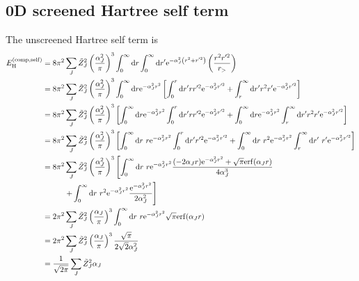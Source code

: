 \documentclass[paper=a4, fontsize=11pt]{article} %
\numberwithin{equation}{section} %
\numberwithin{figure}{section} %
\numberwithin{table}{section} %
\newcommand{\rself}{{\mathrm{self}}}
\newcommand{\re}{{\mathrm{e}}}
\newcommand{\rerf}{{\mathrm{erf}}}
\newcommand{\rd}{{\mathrm{d}}}
\newcommand{\rH}{{\mathrm{H}}}
\newcommand{\rcomp}{{\mathrm{comp}}}
\newcommand{\al}{{\alpha}}
\begin{document}
\subsection{0D screened Hartree self term}
The unscreened Hartree self term is
\begin{equation}
\begin{split}
E_{\rH}^{(\rcomp,\rself)}
&= 8\pi^2 \sum_J \tilde Z_J^2 \left(\frac{\al_J^2}{\pi}\right)^3  \int_0^\infty \rd r \int_0^\infty \rd r' \re^{-\al_J^2 \left(r^2+r'^2\right)} \left( \frac{r^2 r'^2}{r_{>}} \right)\\
&= 8\pi^2 \sum_J \tilde Z_J^2 \left(\frac{\al_J^2}{\pi}\right)^3  \int_0^\infty \rd r \re^{-\al_J^2 r^2} \left[ \int_0^r \rd r' r r'^2 \re^{-\al_J^2 r'^2}+ \int_r^\infty \rd r' r^2 r' \re^{-\al_J^2 r'^2} \right]\\
&= 8\pi^2 \sum_J \tilde Z_J^2 \left(\frac{\al_J^2}{\pi}\right)^3 \left[  \int_0^\infty \rd r \re^{-\al_J^2 r^2} \int_0^r \rd r' r r'^2 \re^{-\al_J^2 r'^2}+  \int_0^\infty \rd r \re^{-\al_J^2 r^2} \int_r^\infty \rd r' r^2 r' \re^{-\al_J^2 r'^2} \right]\\
&= 8\pi^2 \sum_J \tilde Z_J^2 \left(\frac{\al_J^2}{\pi}\right)^3 \left[  \int_0^\infty \rd r\ r \re^{-\al_J^2 r^2} \int_0^r \rd r' r'^2 \re^{-\al_J^2 r'^2}+  \int_0^\infty \rd r\ r^2 \re^{-\al_J^2 r^2} \int_r^\infty \rd r'\ r' \re^{-\al_J^2 r'^2} \right]\\
&= 8\pi^2 \sum_J \tilde Z_J^2 \left(\frac{\al_J^2}{\pi}\right)^3 \left[  \int_0^\infty \rd r\ r \re^{-\al_J^2 r^2} \frac{(-2 \al_J r)\re^{-\al_J^2 r^2} + \sqrt{\pi} \rerf(\al_J r)}{4 \al_J^3}\right.\\  
&\left. \hspace{10mm}+ \int_0^\infty \rd r\ r^2 \re^{-\al_J^2 r^2} \frac{\re^{-\al_J^2 r^2}}{2 \al_J^2} \right]\\
&= 2\pi^2 \sum_J \tilde Z_J^2 \left(\frac{\al_J}{\pi}\right)^3 \int_0^\infty \rd r\ r \re^{-\al_J^2 r^2} \sqrt{\pi} \rerf(\al_J r) \\
&= 2\pi^2 \sum_J \tilde Z_J^2 \left(\frac{\al_J}{\pi}\right)^3 \frac{\sqrt{\pi}}{2\sqrt{2}\al_J^2} \\
&= \frac{1}{\sqrt{2\pi}} \sum_J \tilde Z_J^2 \al_J
\end{split}
\end{equation}
\end{document}
